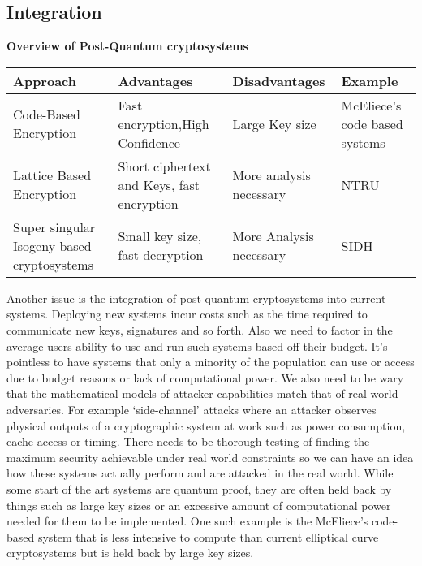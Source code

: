 \documentclass[10pt,a4paper]{IEEEtran}
\begin{document}
\subsection{Integration}
\begin{table*}
\begin{center}
	\textbf{Overview of Post-Quantum cryptosystems}
	\begin{tabular}{ | m{5cm} | m{5cm} | m{3cm} | m{3cm} | }
		\hline
		Approach & Advantages & Disadvantages & Example \\
		\hline
		Code-Based Encryption & Fast encryption,High Confidence & Large Key size & McEliece's code based systems\\
		\hline
		Lattice Based Encryption & Short ciphertext and Keys, fast encryption & More analysis necessary & NTRU \\
		\hline
		Super singular Isogeny based cryptosystems &Small key size, fast decryption &More Analysis necessary & SIDH \\
		\hline
	\end{tabular}
\end{center}
\end{table*}
Another issue is the integration of post-quantum cryptosystems into current systems. Deploying new systems incur costs such as the time required to communicate new keys, signatures and so forth. Also we need to factor in the average users ability to use and run such systems based off their budget. It's pointless to have systems that only a minority of the population can use or access due to budget reasons or lack of computational power.
\newline
We also need to be wary that the mathematical models of attacker capabilities match that of real world adversaries. For example `side-channel' attacks where an attacker observes physical outputs of a cryptographic system at work such as power consumption, cache access or timing. There needs to be thorough testing of finding the maximum security achievable under real world constraints so we can have an idea how these systems actually perform and are attacked in the real world.
\newline
While some start of the art systems are quantum proof, they are often held back by things such as large key sizes or an excessive amount of computational power needed for them to be implemented. One such example is the McEliece's code-based system that is less intensive to compute than current elliptical curve cryptosystems but is held back by large key sizes.
\end{document}
